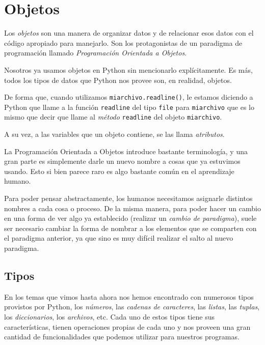 \chapter{Objetos}
\label{objetos}


Los {\it objetos} son una manera de organizar datos y de relacionar esos datos
con el código apropiado para manejarlo.  Son los protagonistas de un
paradigma de programación llamado {\it Programación Orientada a Objetos}.

Nosotros ya usamos objetos en Python sin mencionarlo explícitamente. Es más,
todos los tipos de datos que Python nos provee son, en realidad, objetos.

De forma que, cuando utilizamos \lstinline!miarchivo.readline()!, le estamos
diciendo a Python que llame a la función \lstinline!readline! del tipo
\lstinline!file! para \lstinline!miarchivo! que es lo mismo que decir que
llame al {\it método} \lstinline!readline! del objeto \lstinline!miarchivo!.

A su vez, a las variables que un objeto contiene, se las llama {\it
atributos}.

\begin{sabias_que}
La Programación Orientada a Objetos introduce bastante terminología, y una
gran parte es simplemente darle un nuevo nombre a cosas que ya estuvimos
usando.  Esto si bien parece raro es algo bastante común en el aprendizaje
humano.

Para poder pensar abstractamente, los humanos necesitamos asignarle
distintos nombres a cada cosa o proceso. De la misma manera, para poder
hacer un cambio en una forma de ver algo ya establecido (realizar un {\it
cambio de paradigma}), suele ser necesario cambiar la forma de nombrar a
los elementos que se comparten con el paradigma anterior, ya que sino es
muy difícil realizar el salto al nuevo paradigma.
\end{sabias_que}

\section{Tipos}

En los temas que vimos hasta ahora nos hemos encontrado con numerosos tipos
provistos por Python, los {\it números}, las {\it cadenas de caracteres},
las {\it listas}, las {\it tuplas}, los {\it diccionarios}, los {\it
archivos}, etc.  Cada uno de estos tipos tiene sus características, tienen
operaciones propias de cada uno y nos proveen una gran cantidad de
funcionalidades que podemos utilizar para nuestros programas.

